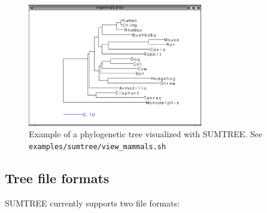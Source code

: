 \documentclass[12pt]{article}
\newcommand{\code}[1]{{\tt #1}}
\begin{document}
\begin{figure}
\begin{center}
\includegraphics[width=3in]{figures/sumtree-mammals.pdf}
\end{center}
\caption{Example of a phylogenetic tree visualized with SUMTREE.
See  \code{examples/sumtree/view\_mammals.sh}}
\label{fig:sumtree}
\end{figure}

\subsection{Tree file formats}

SUMTREE currently supports two file formats:
\end{document}
